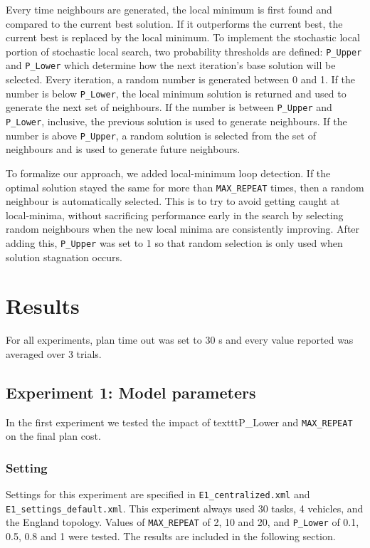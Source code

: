 \documentclass[11pt]{article}
\begin{document}
Every time neighbours are generated, the local minimum is first found and compared to the current best solution. If it outperforms the current best, the current best is replaced by the local minimum. To implement the stochastic local portion of stochastic local search, two probability thresholds are defined: \texttt{P\_Upper} and \texttt{P\_Lower} which determine how the next iteration's base solution will be selected. Every iteration, a random number is generated between 0 and 1. If the number is below \texttt{P\_Lower}, the local minimum solution is returned and used to generate the next set of neighbours. If the number is between \texttt{P\_Upper} and \texttt{P\_Lower}, inclusive, the previous solution is used to generate neighbours. If the number is above \texttt{P\_Upper}, a random solution is selected from the set of neighbours and is used to generate future neighbours.

To formalize our approach, we added local-minimum loop detection. If the optimal solution stayed the same for more than \texttt{MAX\_REPEAT} times, then a random neighbour is automatically selected. This is to try to avoid getting caught at local-minima, without sacrificing performance early in the search by selecting random neighbours when the new local minima are consistently improving. After adding this, \texttt{P\_Upper} was set to 1 so that random selection is only used when solution stagnation occurs.

\section{Results}
For all experiments, plan time out was set to 30 s and every value reported was averaged over 3 trials. 
\subsection{Experiment 1: Model parameters}
In the first experiment we tested the impact of texttt{P\_Lower} and \texttt{MAX\_REPEAT} on the final plan cost.
\subsubsection{Setting}
Settings for this experiment are specified in \texttt{E1\_centralized.xml} and \texttt{E1\_settings\_default.xml}. This experiment always used 30 tasks, 4 vehicles, and the England topology. Values of \texttt{MAX\_REPEAT} of 2, 10 and 20, and  \texttt{P\_Lower} of 0.1, 0.5, 0.8 and 1 were tested. The results are included in the following section. 
\end{document}
